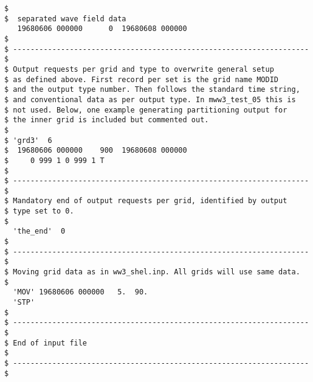 \begin{footnotesize}
\begin{verbatim}
$
$  separated wave field data
   19680606 000000      0  19680608 000000
$
$ -------------------------------------------------------------------- $
$ Output requests per grid and type to overwrite general setup
$ as defined above. First record per set is the grid name MODID
$ and the output type number. Then follows the standard time string,
$ and conventional data as per output type. In mww3_test_05 this is
$ not used. Below, one example generating partitioning output for 
$ the inner grid is included but commented out.
$
$ 'grd3'  6
$  19680606 000000    900  19680608 000000
$     0 999 1 0 999 1 T 
$
$ -------------------------------------------------------------------- $
$ Mandatory end of output requests per grid, identified by output 
$ type set to 0.
$
  'the_end'  0
$
$ -------------------------------------------------------------------- $
$ Moving grid data as in ww3_shel.inp. All grids will use same data.
$
  'MOV' 19680606 000000   5.  90.
  'STP'
$
$ -------------------------------------------------------------------- $
$ End of input file                                                    $
$ -------------------------------------------------------------------- $
\end{verbatim}
\end{footnotesize}
